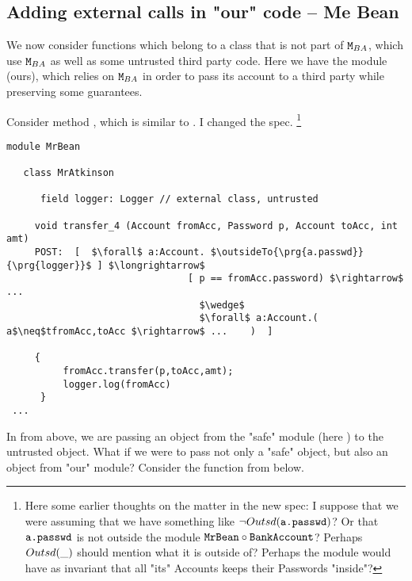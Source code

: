 \subsection{Adding external calls in "our" code --  Me Bean}

We now consider functions which belong  to a class that is not part of ${\texttt{M}}{_{BA}}$, which use ${\texttt{M}}{_{BA}}$ as well as some untrusted third party code.  Here we have the module   (ours), which relies on ${\texttt{M}}{_{BA}}$ in order to pass its account to a third party while preserving some guarantees.

Consider method  , which  is similar to  . \SP I changed the spec.
\footnote{Here some earlier thoughts on the matter in the new spec: I suppose that we were assuming that we have something like  $\neg Outsd({\texttt{a.passwd}})$? Or that ${{\texttt{a.passwd}}}$ is not outside the module 
${\texttt{MrBean}}\circ{\texttt{BankAccount}}$? Perhaps $Outsd(\_)$ should mention what it is outside of? Perhaps the module  would have as invariant that all "its" Accounts keeps their Passwords "inside"?}


\begin{lstlisting}[language=chainmail, mathescape=true, frame=lines]
module MrBean

   class MrAtkinson

      field logger: Logger // external class, untrusted

     void transfer_4 (Account fromAcc, Password p, Account toAcc, int amt) 
     POST:  [  $\forall$ a:Account. $\outsideTo{\prg{a.passwd}}{\prg{logger}}$ ] $\longrightarrow$ 
                                [ p == fromAcc.password) $\rightarrow$ ...
                                  $\wedge$
                                  $\forall$ a:Account.( a$\neq$tfromAcc,toAcc $\rightarrow$ ...    )  ]

     {
          fromAcc.transfer(p,toAcc,amt);
          logger.log(fromAcc)
      }
 ...
\end{lstlisting}


In  from above, we are passing  an object from
the "safe" module (here ) to the untrusted object. 
What if we were  to pass not only a "safe" object, but also an object from "our" module?
Consider the function  from below.


